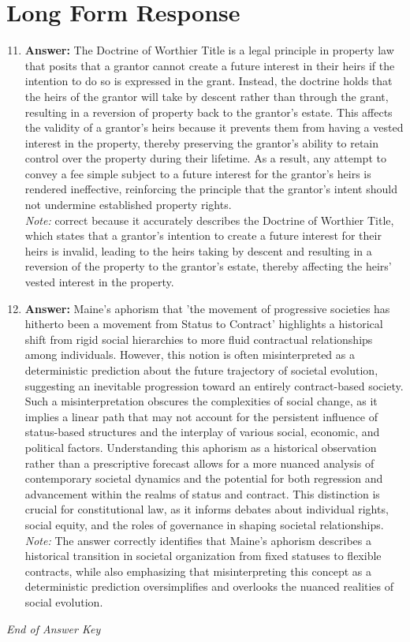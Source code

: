\documentclass[12pt]{article}
\begin{document}
\section*{Long Form Response}
\begin{enumerate}[label=\arabic*.]
\setcounter{enumi}{10}
\item \textbf{Answer:} The Doctrine of Worthier Title is a legal principle in property law that posits that a grantor cannot create a future interest in their heirs if the intention to do so is expressed in the grant. Instead, the doctrine holds that the heirs of the grantor will take by descent rather than through the grant, resulting in a reversion of property back to the grantor's estate. This affects the validity of a grantor's heirs because it prevents them from having a vested interest in the property, thereby preserving the grantor's ability to retain control over the property during their lifetime. As a result, any attempt to convey a fee simple subject to a future interest for the grantor's heirs is rendered ineffective, reinforcing the principle that the grantor's intent should not undermine established property rights.
\\ \textit{Note:} correct because it accurately describes the Doctrine of Worthier Title, which states that a grantor's intention to create a future interest for their heirs is invalid, leading to the heirs taking by descent and resulting in a reversion of the property to the grantor's estate, thereby affecting the heirs' vested interest in the property.
\item \textbf{Answer:} Maine's aphorism that 'the movement of progressive societies has hitherto been a movement from Status to Contract' highlights a historical shift from rigid social hierarchies to more fluid contractual relationships among individuals. However, this notion is often misinterpreted as a deterministic prediction about the future trajectory of societal evolution, suggesting an inevitable progression toward an entirely contract-based society. Such a misinterpretation obscures the complexities of social change, as it implies a linear path that may not account for the persistent influence of status-based structures and the interplay of various social, economic, and political factors. Understanding this aphorism as a historical observation rather than a prescriptive forecast allows for a more nuanced analysis of contemporary societal dynamics and the potential for both regression and advancement within the realms of status and contract. This distinction is crucial for constitutional law, as it informs debates about individual rights, social equity, and the roles of governance in shaping societal relationships.
\\ \textit{Note:} The answer correctly identifies that Maine's aphorism describes a historical transition in societal organization from fixed statuses to flexible contracts, while also emphasizing that misinterpreting this concept as a deterministic prediction oversimplifies and overlooks the nuanced realities of social evolution.
\end{enumerate}

\vfill
\noindent\textit{End of Answer Key}
\end{document}
